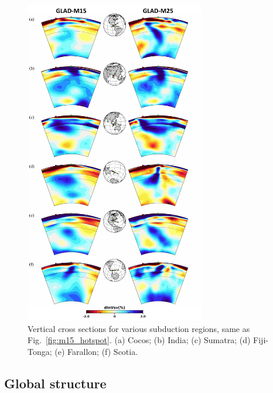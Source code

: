 \documentclass[extra,mreferee]{gji}
\begin{document}
\begin{figure}
  \centering
  \includegraphics[width=0.7\textwidth]{figures/compare_M15/subduction.pdf}
  \caption{\small{ Vertical cross sections for various subduction regions, same as Fig.~\ref{fig:m15_hotspot}.
  (a) Cocos; (b) India; (c) Sumatra; (d) Fiji-Tonga; (e) Farallon; (f) Scotia. }}
  \label{fig:m15_subduction}
\end{figure}

\subsection{Global structure}
\end{document}
